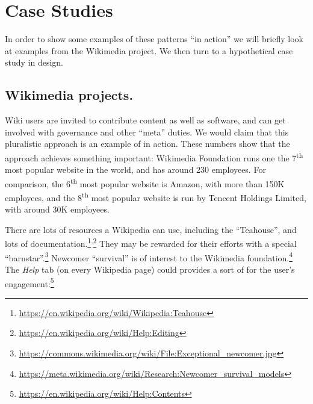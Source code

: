 \section{Case Studies}\label{sec:Case Studies}

In order to show some examples of these patterns ``in action'' we will
briefly look at examples from the Wikimedia project.  We then turn to
a hypothetical case study in design.

\subsection{Wikimedia projects.}

Wiki users are invited to contribute content as well as software, and
can get involved with governance and other ``meta'' duties.  We would
claim that this pluralistic approach is an example of
 in action.  These numbers show that the
approach achieves something important: Wikimedia Foundation runs one
the 7\textsuperscript{th} most popular website in the world, and has
around 230 employees.  For comparison, the 6\textsuperscript{th} most
popular website is Amazon, with more than 150K employees, and the
8\textsuperscript{th} most popular website is run by Tencent Holdings
Limited, with around 30K employees.

There are lots of resources a Wikipedia 
can use, including the ``Teahouse'', and lots of
documentation.\footnote{\url{https://en.wikipedia.org/wiki/Wikipedia:Teahouse}}\textsuperscript{,}\footnote{\url{https://en.wikipedia.org/wiki/Help:Editing}}
They may be rewarded for their efforts with a special
``barnstar''.\footnote{\url{https://commons.wikimedia.org/wiki/File:Exceptional_newcomer.jpg}}
Newcomer ``survival'' is of interest to the Wikimedia
foundation.\footnote{\url{https://meta.wikimedia.org/wiki/Research:Newcomer_survival_models}}
%
The \emph{Help} tab (on every Wikipedia page) could provides a sort of
 for the user's
engagement:\footnote{\url{https://en.wikipedia.org/wiki/Help:Contents}}

